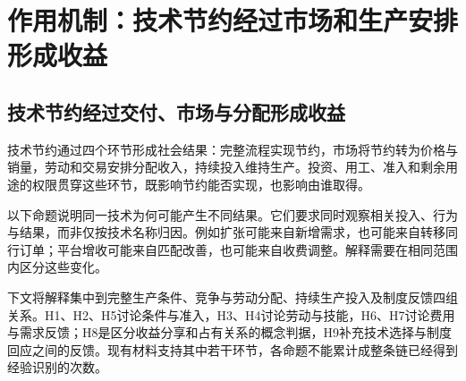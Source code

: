 \documentclass[UTF8,fontset=windows,12pt,a4paper,oneside,openany]{ctexbook}
\begin{document}
\chapter{作用机制：技术节约经过市场和生产安排形成收益}\label{ch:4}

\section{技术节约经过交付、市场与分配形成收益}

技术节约通过四个环节形成社会结果：完整流程实现节约，市场将节约转为价格与销量，劳动和交易安排分配收入，持续投入维持生产。投资、用工、准入和剩余用途的权限贯穿这些环节，既影响节约能否实现，也影响由谁取得。

以下命题说明同一技术为何可能产生不同结果。它们要求同时观察相关投入、行为与结果，而非仅按技术名称归因。例如扩张可能来自新增需求，也可能来自转移同行订单；平台增收可能来自匹配改善，也可能来自收费调整。解释需要在相同范围内区分这些变化。

下文将解释集中到完整生产条件、竞争与劳动分配、持续生产投入及制度反馈四组关系。H1、H2、H5讨论条件与准入，H3、H4讨论劳动与技能，H6、H7讨论费用与需求反馈；H8是区分收益分享和占有关系的概念判据，H9补充技术选择与制度回应之间的反馈。现有材料支持其中若干环节，各命题不能累计成整条链已经得到经验识别的次数。
\end{document}
